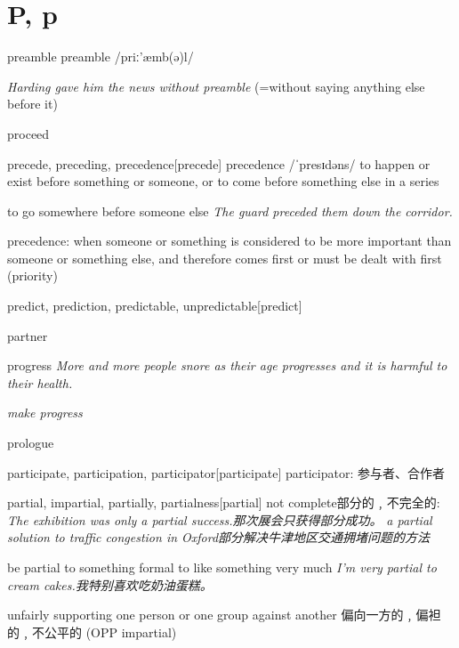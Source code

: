 \section{P, p}

\begin{word}{preamble}
    preamble /priː'æmb(ə)l/

\textit{Harding gave him the news without preamble} (=without saying anything else before it)
\end{word}

\begin{word}{proceed}
\end{word}

\begin{word}{precede, preceding, precedence}[precede]
    precedence /ˈpresɪdəns/
    to happen or exist before something or someone, or to come before something else in a series

    to go somewhere before someone else
    \textit{The guard preceded them down the corridor.}

    precedence: when someone or something is considered to be more important than someone or something else, and therefore comes first or must be dealt with first (priority)
\end{word}


\begin{word}{predict, prediction, predictable, unpredictable}[predict]
\end{word}

\begin{word}{partner}
\end{word}

\begin{word}{progress}
    \textit{More and more people snore as their age progresses and it is harmful to their health.}

    \textit{make progress}
\end{word}

\begin{word}{prologue}
\end{word}

\begin{word}{participate, participation, participator}[participate]
    participator: 参与者、合作者
\end{word}

\begin{word}{partial, impartial, partially, partialness}[partial]
    not complete部分的﹐不完全的:
    \textit{The exhibition was only a partial success.那次展会只获得部分成功。}
    \textit{a partial solution to traffic congestion in Oxford部分解决牛津地区交通拥堵问题的方法}

    be partial to something formal to like something very much
    \textit{I'm very partial to cream cakes.我特别喜欢吃奶油蛋糕。}

    unfairly supporting one person or one group against another 偏向一方的﹐偏袒的﹐不公平的 (OPP impartial)
\end{word}

